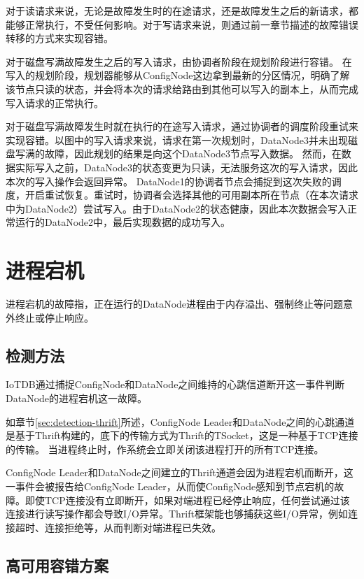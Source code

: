 对于读请求来说，无论是故障发生时的在途请求，还是故障发生之后的新请求，都能够正常执行，不受任何影响。对于写请求来说，则通过前一章节描述的故障错误转移的方式来实现容错。

对于磁盘写满故障发生之后的写入请求，由协调者阶段在规划阶段进行容错。
在写入的规划阶段，规划器能够从ConfigNode这边拿到最新的分区情况，明确了解该节点只读的状态，并会将本次的请求给路由到其他可以写入的副本上，从而完成写入请求的正常执行。

对于磁盘写满故障发生时就在执行的在途写入请求，通过协调者的调度阶段重试来实现容错。以图中的写入请求来说，请求在第一次规划时，DataNode3并未出现磁盘写满的故障，因此规划的结果是向这个DataNode3节点写入数据。
然而，在数据实际写入之前，DataNode3的状态变更为只读，无法服务这次的写入请求，因此本次的写入操作会返回异常。
DataNode1的协调者节点会捕捉到这次失败的调度，开启重试恢复。重试时，协调者会选择其他的可用副本所在节点（在本次请求中为DataNode2）尝试写入。由于DataNode2的状态健康，因此本次数据会写入正常运行的DataNode2中，最后实现数据的成功写入。


\section{进程宕机}

进程宕机的故障指，正在运行的DataNode进程由于内存溢出、强制终止等问题意外终止或停止响应。

\subsection{检测方法}

IoTDB通过捕捉ConfigNode和DataNode之间维持的心跳信道断开这一事件判断DataNode的进程宕机这一故障。

如章节\ref{sec:detection-thrift}所述，ConfigNode Leader和DataNode之间的心跳通道是基于Thrift构建的，底下的传输方式为Thrift的TSocket，这是一种基于TCP连接的传输。
当进程终止时，作系统会立即关闭该进程打开的所有TCP连接。

ConfigNode Leader和DataNode之间建立的Thrift通道会因为进程宕机而断开，这一事件会被报告给ConfigNode Leader，从而使ConfigNode感知到节点宕机的故障。即使TCP连接没有立即断开，如果对端进程已经停止响应，任何尝试通过该连接进行读写操作都会导致I/O异常。Thrift框架能也够捕获这些I/O异常，例如连接超时、连接拒绝等，从而判断对端进程已失效。


\subsection{高可用容错方案}

